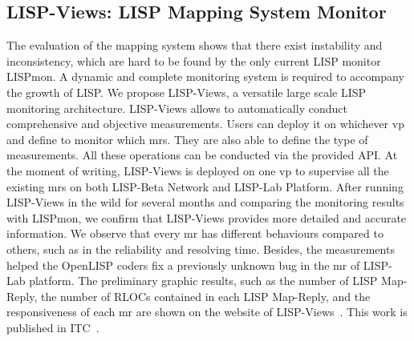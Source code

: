 \subsection{LISP-Views: LISP Mapping System Monitor}
The evaluation of the mapping system shows that there exist instability and inconsistency, which are hard to be found by the only current LISP monitor LISPmon. A dynamic and complete monitoring system is required to accompany the growth of LISP. We propose LISP-Views, a versatile large scale LISP monitoring architecture. LISP-Views allows to automatically conduct comprehensive and objective measurements. Users can deploy it on whichever \acrshort{vp} and define to monitor which \acrshort{mr}s. They are also able to define the type of measurements. All these operations can be conducted via the provided API. At the moment of writing, LISP-Views is deployed on one \acrshort{vp} to supervise all the existing \acrshort{mr}s on both LISP-Beta Network and LISP-Lab Platform. After running LISP-Views in the wild for several months and comparing the monitoring results with LISPmon, we confirm that LISP-Views provides more detailed and accurate information. We observe that every \acrshort{mr} has different behaviours compared to others, such as in the reliability and resolving time. Besides, the measurements helped the OpenLISP coders fix a previously unknown bug in the \acrshort{mr} of LISP-Lab platform. The preliminary graphic results, such as the number of LISP Map-Reply, the number of RLOCs contained in each LISP Map-Reply, and the responsiveness of each \acrshort{mr} are shown on the website of LISP-Views~\cite{lispviews}. This work is published in ITC~\cite{li2017lisp}.

